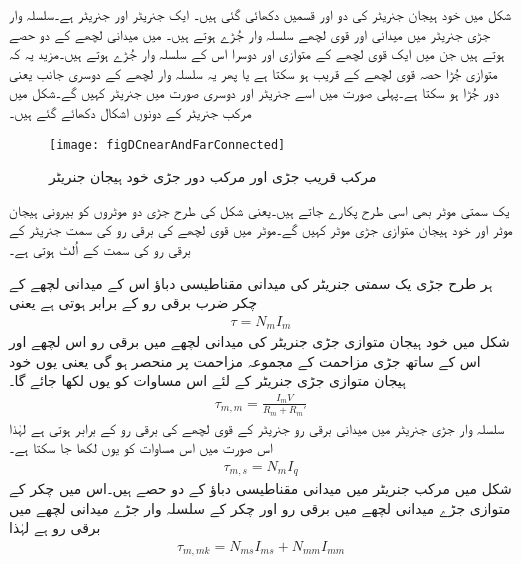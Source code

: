 شکل   میں خود ہیجان جنریٹر کی دو اور قسمیں دکھائی گئی ہیں۔ ایک  جنریٹر  اور  جنریٹر  ہے۔سلسلہ وار جڑی جنریٹر میں میدانی اور قوی لچھے سلسلہ وار جُڑے ہوتے ہیں۔ میں میدانی لچھے کے دو حصے ہوتے ہیں جن میں ایک قوی لچھے کے متوازی اور دوسرا اس کے سلسلہ وار جُڑے ہوتے ہیں۔مزید یہ کہ متوازی جُڑا حصہ قوی لچھے کے قریب ہو سکتا ہے یا پھر یہ سلسلہ وار لچھے کے دوسری جانب یعنی دور جُڑا ہو سکتا ہے۔پہلی صورت میں اسے  جنریٹر اور دوسری صورت میں  جنریٹر کہیں گے۔شکل   میں مرکب جنریٹر کے دونوں اشکال دکھائے گئے ہیں۔ 
\begin{figure}
\centering
\texttt{[image: figDCnearAndFarConnected]}
\caption{مرکب قریب جڑی اور مرکب دور جڑی خود ہیجان جنریٹر}
\label{شکل_یکسمتی_قریب_دور_جڑی_جنریٹر}
\end{figure}

یک سمتی موٹر بھی اسی طرح پکارے جاتے ہیں۔یعنی شکل   کی طرح جڑی دو موٹروں کو بیرونی ہیجان موٹر اور خود ہیجان متوازی جڑی موٹر کہیں گے۔موٹر میں قوی لچھے کی برقی رو کی سمت جنریٹر کے برقی رو کی سمت کے اُلٹ ہوتی ہے۔

ہر طرح جڑی یک سمتی جنریٹر کی میدانی مقناطیسی دباؤ اس کے میدانی لچھے کے چکر ضرب برقی رو کے برابر ہوتی ہے یعنی
\begin{align}
\tau=N_m I_m
\end{align}
شکل   میں خود ہیجان متوازی جڑی جنریٹر کی میدانی لچھے میں برقی رو اس لچھے اور اس کے ساتھ جڑی مزاحمت کے مجموعہ  مزاحمت  پر منحصر ہو گی یعنی  یوں خود ہیجان متوازی جڑی جنریٹر کے لئے اس مساوات کو یوں لکھا جائے گا۔
\begin{align}
\tau_{m,m}=\frac{I_m V}{R_m+R_m'}
\end{align}
سلسلہ وار جڑی جنریٹر میں میدانی برقی رو جنریٹر کے قوی لچھے کی برقی رو کے برابر ہوتی ہے لہٰذا اس صورت میں اس مساوات کو یوں لکھا جا سکتا ہے۔
\begin{align}
\tau_{m,s}=N_m I_q
\end{align}
شکل   میں مرکب جنریٹر میں میدانی مقناطیسی دباؤ کے دو حصے ہیں۔اس میں  چکر کے متوازی جڑے میدانی لچھے میں برقی رو   اور   چکر کے سلسلہ وار جڑے میدانی لچھے میں  برقی رو  ہے لہٰذا
\begin{align}
\tau_{m,mk}=N_{ms} I_{ms}+N_{mm} I_{mm}
\end{align}

